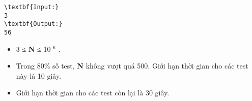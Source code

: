 \begin{verbatim}
\textbf{Input:}
3
\textbf{Output:}
56\end{verbatim}
\begin{itemize}
	\item 3 ≤ \textbf{ N } ≤ 10 $^ 6 $ .
	\item Trong 80\% số test, \textbf{ N } không vượt quá 500. Giới hạn thời gian cho các test này là 10 giây.
	\item Giới hạn thời gian cho các test còn lại là 30 giây.
\end{itemize}
